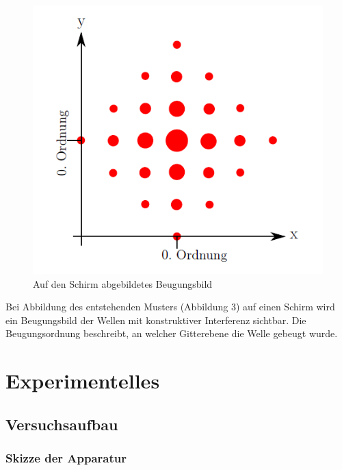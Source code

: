 \documentclass[12pt,a4paper,titlepage,headinclude,bibtotoc]{scrartcl}
\begin{document}
\begin{figure} [h]
\begin{center}
\includegraphics[scale=0.5]{Beugungsbild.png} \end{center}
\caption{Auf den Schirm abgebildetes Beugungsbild }
\end{figure}

Bei Abbildung des entstehenden Musters (Abbildung 3) auf einen Schirm wird ein Beugungsbild der Wellen mit konstruktiver Interferenz sichtbar. Die Beugungsordnung beschreibt, an welcher Gitterebene die Welle gebeugt wurde. 


\clearpage

\section{Experimentelles}

\subsection{Versuchsaufbau}

\subsubsection{Skizze der Apparatur}
\end{document}
